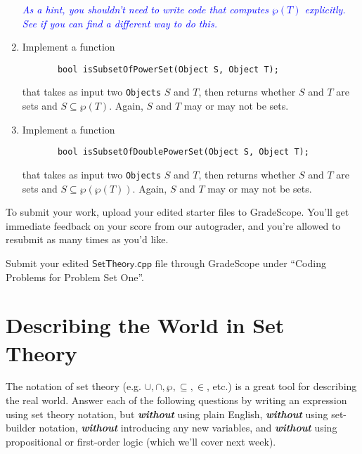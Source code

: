 \documentclass{article}
\renewcommand{\(}{\left(}
\renewcommand{\)}{\right)}
\theoremstyle{plain}
\theoremstyle{plain}
\theoremstyle{definition}
\begin{document}
\begin{enumerate}[label*=\roman*.,ref=\roman*]
\textit{\textcolor{blue}{As a hint, you shouldn't need to write code that computes $\wp(T)$ explicitly. See if you can find a different way to do this.}}

\item Implement a function
\begin{verbatim}
       bool isSubsetOfPowerSet(Object S, Object T);
\end{verbatim}
that takes as input two \texttt{Objects} $S$ and $T$, then returns whether $S$ and $T$ are sets and $S \subseteq \wp(T)$. Again, $S$ and $T$ may or may not be sets.

\item Implement a function
\begin{verbatim}
       bool isSubsetOfDoublePowerSet(Object S, Object T);
\end{verbatim}
that takes as input two \texttt{Objects} $S$ and $T$, then returns whether $S$ and $T$ are sets and $S \subseteq \wp(\wp(T))$. Again, $S$ and $T$ may or may not be sets.

\end{enumerate}

To submit your work, upload your edited starter files to GradeScope. You'll get immediate feedback on your score from our autograder, and you're allowed to resubmit as many times as you'd like.

\begin{shaded}
Submit your edited $\mathsf{SetTheory.cpp}$ file through GradeScope under ``Coding Problems for Problem Set One''.
\end{shaded}

\pagebreak

\section{Describing the World in Set Theory}

The notation of set theory (e.g. $\cup, \cap, \wp, \subseteq, \in$, etc.) is a great tool for describing the real world. Answer
each of the following questions by writing an expression using set theory notation, but \textit{\textbf{without}} using
plain English, \textit{\textbf{without}} using set-builder notation, \textit{\textbf{without}} introducing any new variables, and \textit{\textbf{without}} using propositional or first-order logic (which we'll cover next week).
\end{document}
